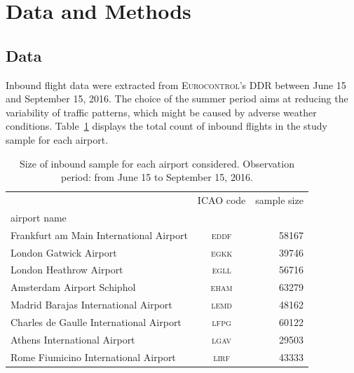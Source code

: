 \documentclass[]{elsarticle}
\newcommand{\airp}[1]{\textcolor{#1}{\textsc{#1}}}
\begin{document}
\section{Data and Methods}\label{sec:data_methods}

\subsection{Data}\label{sec:dm_data}

Inbound flight data were extracted from \textsc{Eurocontrol}'s \ac{DDR} between June 15 and September 15, 2016.
The choice of the summer period aims at reducing the variability of traffic patterns, which might be caused by adverse weather conditions.
Table~\ref{tab:flights_count} displays the total count of inbound flights in the study sample for each airport.

\begin{table}[tbp]
  \caption{Size of inbound sample for each airport considered. Observation period: from June 15 to September 15, 2016.}\label{tab:flights_count}
    \begin{tabular}{lcr}
      \toprule
      {} & \acs{ICAO} code &  sample size \\
      airport name                                       &                 &              \\
      \midrule
      Frankfurt am Main International Airport &     \airp{eddf} &        58167 \\
      London Gatwick Airport                  &     \airp{egkk} &        39746 \\
      London Heathrow Airport                 &     \airp{egll} &        56716 \\
      Amsterdam Airport Schiphol              &     \airp{eham} &        63279 \\
      Madrid Barajas International Airport    &     \airp{lemd} &        48162 \\
      Charles de Gaulle International Airport &     \airp{lfpg} &        60122 \\
      Athens International Airport            &     \airp{lgav} &        29503 \\
      Rome Fiumicino International Airport    &     \airp{lirf} &        43333 \\
      \bottomrule
    \end{tabular}
\end{table}
\end{document}
